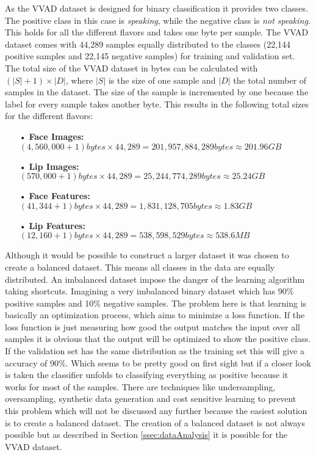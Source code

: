 As the VVAD dataset is designed for binary classification it provides two classes.
The positive class in this case is \emph{speaking}, while the negative class is \emph{not speaking}. This holds for all the different flavors and takes one byte per sample.
The VVAD dataset comes with 44,289
samples equally distributed to the classes (22,144 
positive samples and 22,145 
negative samples) for training and validation set.
The total size of the VVAD dataset in bytes can be calculated with $(|S| + 1) \times |D|$, where $|S|$ is the size of one sample and $|D|$ the total number of samples in the dataset. 
The size of the sample is incremented by one because the label for every sample takes another byte.
This results in the following total sizes for the different flavors:
\begin{itemize}
\item[•] \textbf{Face Images:} $(4,560,000 + 1) bytes \times 44,289 = 201,957,884,289 bytes \approx 201.96 GB $ 
\item[•] \textbf{Lip Images:} $(570,000 + 1) bytes \times 44,289 = 25,244,774,289 bytes \approx 25.24 GB $ 
\item[•] \textbf{Face Features:} $(41,344 + 1) bytes \times 44,289 = 1,831,128,705 bytes \approx 1.83 GB $ 
\item[•] \textbf{Lip Features:} $(12,160 + 1) bytes \times 44,289 = 538,598,529 bytes \approx 538.6 MB $ 
\end{itemize}
Although it would be possible to construct a larger dataset it was chosen to create a balanced dataset.
This means all classes in the data are equally distributed.
An imbalanced dataset impose the danger of the learning algorithm taking shortcuts.
Imagining a very imbalanced binary dataset which has 90\% positive samples and 10\% negative samples.
The problem here is that learning is basically an optimization process, which aims to minimize a loss function.
If the loss function is just measuring how good the output matches the input over all samples it is obvious that the output will be optimized to show the positive class.
If the validation set has the same distribution as the training set this will give a accuracy of 90\%.
Which seems to be pretty good on first sight but if a closer look is taken the classifier unfolds to classifying everything as positive because it works for most of the samples.
There are techniques like undersampling, oversampling, synthetic data generation and cost sensitive learning to prevent this problem which will not be discussed any further because the easiest solution is to create a balanced dataset.
The creation of a balanced dataset is not always possible but as described in Section \ref{ssec:dataAnalysis} it is possible for the VVAD dataset.


